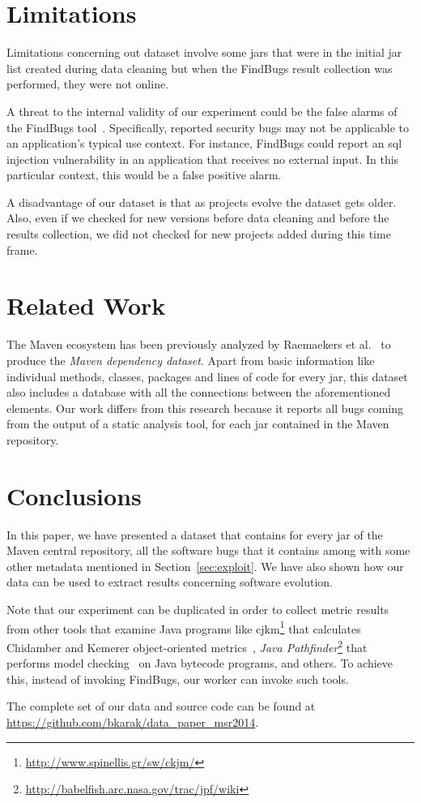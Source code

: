 \documentclass{sig-alternate}
\begin{document}
\section{Limitations}
\label{sec:limit}

Limitations concerning out dataset involve some
{\sc jar}s that were in the initial {\sc jar} list
created during data cleaning but when the
FindBugs result collection was performed, they
were not online.

A threat to the internal validity of our experiment could be the false
alarms of the FindBugs tool~\cite{AP10}.
Specifically, reported security bugs may not
be applicable to an application's typical use context.
For instance, FindBugs could report an {\sc sql}
injection vulnerability
in an application that receives no external input.
In this particular context, this would be a false
positive alarm.

A disadvantage of our dataset is that as projects evolve
the dataset gets older. Also, even if we checked for
new versions before data cleaning and before
the results collection, we did not checked for new
projects added during this time frame.

\section{Related Work}
\label{sec:rel}

The Maven ecosystem has been previously analyzed by
Raemaekers et al.~\cite{RDV13}
to produce the {\it Maven dependency dataset}.
Apart from basic information like individual methods, classes,
packages and lines of code for every {\sc jar}, this dataset
also includes a database with all the
connections between the aforementioned elements.
Our work differs from this research because it
reports all bugs coming from the output of a
static analysis tool, for each {\sc jar}
contained in the Maven repository.

\section{Conclusions}
\label{sec:conc}

In this paper, we have presented a dataset that contains
for every {\sc jar} of the Maven central repository,
all the software bugs that it contains among with some
other metadata mentioned in Section~\ref{sec:exploit}.
We have also shown how our data can be
used to extract results concerning software evolution.

Note that our experiment can be duplicated
in order to collect metric results from other tools that
examine Java programs like
{\sc cjkm}\footnote{\url{http://www.spinellis.gr/sw/ckjm/}}
that calculates Chidamber and Kemerer
object-oriented metrics~\cite{CK91},
{\it Java Pathfinder}\footnote{\url{http://babelfish.arc.nasa.gov/trac/jpf/wiki}}
that performs
model checking~\cite{CEES09} on Java bytecode programs,
and others. To achieve this, instead of invoking
FindBugs, our worker can invoke such tools.

The complete set of our data and source code
can be found at
\url{https://github.com/bkarak/data_paper_msr2014}.


  
\end{document}
